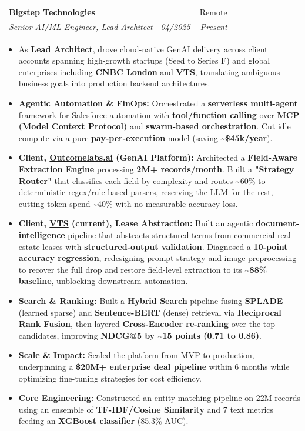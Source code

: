 \documentclass[11pt,a4paper]{article}
\makeatletter
\newcommand{\resumeItem}[1]{
  \item\small{
    {#1 \vspace{-2pt}}
  }
}
\newcommand{\resumeSubheading}[4]{
  \vspace{-1pt}\item
    \begin{tabular*}{0.97\textwidth}[t]{l@{\extracolsep{\fill}}r}
      \textbf{#1} & #2 \\
      \textit{\small#3} & \textit{\small #4} \\
    \end{tabular*}\vspace{-5pt}
}
\newcommand{\resumeItemListStart}{\begin{itemize}[itemsep=2pt, topsep=0pt, partopsep=0pt]}
\newcommand{\resumeItemListEnd}{\end{itemize}\vspace{-5pt}}
\makeatother
\begin{document}
    \resumeSubheading
      {\href{https://bigsteptech.com/}{Bigstep Technologies}}{Remote}
      {Senior AI/ML Engineer, Lead Architect}{04/2025 -- Present}
      \resumeItemListStart
        \resumeItem{As \textbf{Lead Architect}, drove cloud-native GenAI delivery across client accounts spanning high-growth startups (Seed to Series F) and global enterprises including \textbf{CNBC London} and \textbf{VTS}, translating ambiguous business goals into production backend architectures.}
        \resumeItem{\textbf{Agentic Automation \& FinOps:} Orchestrated a \textbf{serverless multi-agent} framework for Salesforce automation with \textbf{tool/function calling} over \textbf{MCP (Model Context Protocol)} and \textbf{swarm-based orchestration}. Cut idle compute via a pure \textbf{pay-per-execution} model (saving \textbf{\textasciitilde{}\$45k/year}).}
        \resumeItem{\textbf{Client, \href{https://www.outcomelabs.ai/}{Outcomelabs.ai} (GenAI Platform):} Architected a \textbf{Field-Aware Extraction Engine} processing \textbf{2M+ records/month}. Built a \textbf{"Strategy Router"} that classifies each field by complexity and routes \textasciitilde{}60\% to deterministic regex/rule-based parsers, reserving the LLM for the rest, cutting token spend \textasciitilde{}40\% with no measurable accuracy loss.}
        \resumeItem{\textbf{Client, \href{https://www.vts.com/}{VTS} (current), Lease Abstraction:} Built an agentic \textbf{document-intelligence} pipeline that abstracts structured terms from commercial real-estate leases with \textbf{structured-output validation}. Diagnosed a \textbf{10-point accuracy regression}, redesigning prompt strategy and image preprocessing to recover the full drop and restore field-level extraction to its \textbf{\textasciitilde{}88\% baseline}, unblocking downstream automation.}
        \resumeItem{\textbf{Search \& Ranking:} Built a \textbf{Hybrid Search} pipeline fusing \textbf{SPLADE} (learned sparse) and \textbf{Sentence-BERT} (dense) retrieval via \textbf{Reciprocal Rank Fusion}, then layered \textbf{Cross-Encoder re-ranking} over the top candidates, improving \textbf{NDCG@5 by \textasciitilde{}15 points (0.71 to 0.86)}.}
        \resumeItem{\textbf{Scale \& Impact:} Scaled the platform from MVP to production, underpinning a \textbf{\$20M+ enterprise deal pipeline} within 6 months while optimizing fine-tuning strategies for cost efficiency.}
        \resumeItem{\textbf{Core Engineering:} Constructed an entity matching pipeline on 22M records using an ensemble of \textbf{TF-IDF/Cosine Similarity} and 7 text metrics feeding an \textbf{XGBoost classifier} (85.3\% AUC).}
      \resumeItemListEnd
\end{document}
